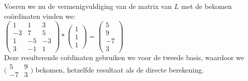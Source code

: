 \documentclass[lineaire_algebra_oplossingen.tex]{subfiles}
\begin{document}
Voeren we nu de vermenigvuldiging van de matrix van $L$ met de bekomen co\"ordinaten vinden we:\\

$\begin{pmatrix}
1 & 1 & 3\\
-3 & 7 & 5\\
1 & -5 & -3\\
3 & -1 & 1
\end{pmatrix} * \begin{pmatrix}
1\\
1\\
1
\end{pmatrix} = \begin{pmatrix}
5\\
9\\
-7\\
3
\end{pmatrix}$\\

Deze resulterende co\"rdinaten gebruiken we voor de tweede basis, waardoor we $\bigl(
\begin{smallmatrix}
5&9\\ -7&3
\end{smallmatrix}\bigr)$ bekomen, hetzelfde resultaat als de directe berekening.
\end{document}
